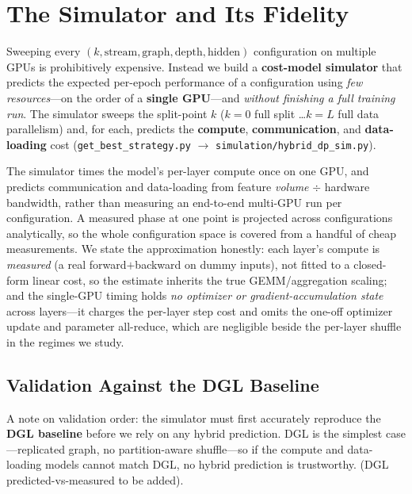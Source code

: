 \section{The Simulator and Its Fidelity}
\label{sec:simulator}

Sweeping every $(k, \text{stream}, \text{graph}, \text{depth}, \text{hidden})$
configuration on multiple GPUs is prohibitively expensive. Instead we build a
\textbf{cost-model simulator} that predicts the expected per-epoch performance of a
configuration using \emph{few resources}---on the order of a \textbf{single GPU}---and
\emph{without finishing a full training run}. The simulator sweeps the split-point $k$
($k{=}0$ full split \ldots $k{=}L$ full data parallelism) and, for each, predicts the
\textbf{compute}, \textbf{communication}, and \textbf{data-loading} cost
(\texttt{get\_best\_strategy.py} $\rightarrow$ \texttt{simulation/hybrid\_dp\_sim.py}).

The simulator times the model's per-layer compute once on one GPU, and predicts
communication and data-loading from feature \emph{volume} $\div$ hardware bandwidth,
rather than measuring an end-to-end multi-GPU run per configuration. A measured phase at
one point is projected across configurations analytically, so the whole configuration
space is covered from a handful of cheap measurements. We state the approximation
honestly: each layer's compute is \emph{measured} (a real forward$+$backward on dummy
inputs), not fitted to a closed-form linear cost, so the estimate inherits the true
GEMM/aggregation scaling; and the single-GPU timing holds \emph{no optimizer or
gradient-accumulation state} across layers---it charges the per-layer step cost and omits
the one-off optimizer update and parameter all-reduce, which are negligible beside the
per-layer shuffle in the regimes we study.

\subsection{Validation Against the DGL Baseline}
\label{sec:sim-baseline}

A note on validation order: the simulator must first accurately reproduce the
\textbf{DGL baseline} before we rely on any hybrid prediction. DGL is the simplest
case---replicated graph, no partition-aware shuffle---so if the compute and data-loading
models cannot match DGL, no hybrid prediction is trustworthy. \placeholder{} (DGL
predicted-vs-measured to be added).

